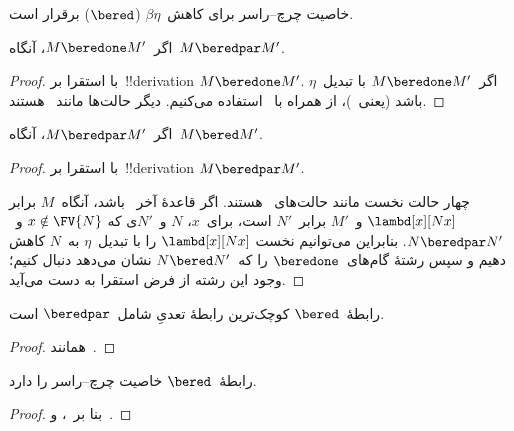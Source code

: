 \documentclass[../../../include/open-logic-section]{subfiles}
\begin{document}


خاصیت چرچ--راسر برای کاهش~$\beta\eta$ ($\bered$) برقرار است.

\begin{lem}
  اگر~$M \beredone M'$، آنگاه~$M \beredpar M'$.
\end{lem}

\begin{proof} 
  با استقرا بر~!!{derivation}ِ $M \beredone M'$. اگر~$M \beredone M'$
  با تبدیل~$\eta$ باشد (یعنی~)، از
   همراه با~ استفاده
  می‌کنیم. دیگر حالت‌ها مانند~ هستند.
\end{proof}


\begin{lem}
  اگر~$M \beredpar M'$، آنگاه~$M \bered M'$.
\end{lem}

\begin{proof} با استقرا بر~!!{derivation}ِ $M \beredpar M'$.

  چهار حالت نخست مانند حالت‌های~ هستند.
  اگر قاعدهٔ آخر~ باشد، آنگاه~$M$ برابر
  $\lambd[x][Nx]$ و~$M'$ برابر~$N'$ است، برای~$x$، $N$ و~$N'$ی که
  $x \notin \FV{N}$ و~$N \beredpar N'$. بنابراین می‌توانیم نخست
  $\lambd[x][Nx]$ را با تبدیل~$\eta$ به~$N$ کاهش دهیم و سپس رشتهٔ
  گام‌های~$\beredone$ را که~$N \bered N'$ نشان می‌دهد دنبال کنیم؛
  وجود این رشته از فرض استقرا به دست می‌آید.
\end{proof}


\begin{lem}
  رابطهٔ~$\bered$ کوچک‌ترین رابطهٔ تعدیِ شامل~$\beredpar$ است.
\end{lem}

\begin{proof}
  همانند~.
\end{proof}

\begin{thm}
  رابطهٔ~$\bered$ خاصیت چرچ--راسر را دارد.
\end{thm}

\begin{proof}
  بنا بر~،  و~.
\end{proof}
\end{document}
